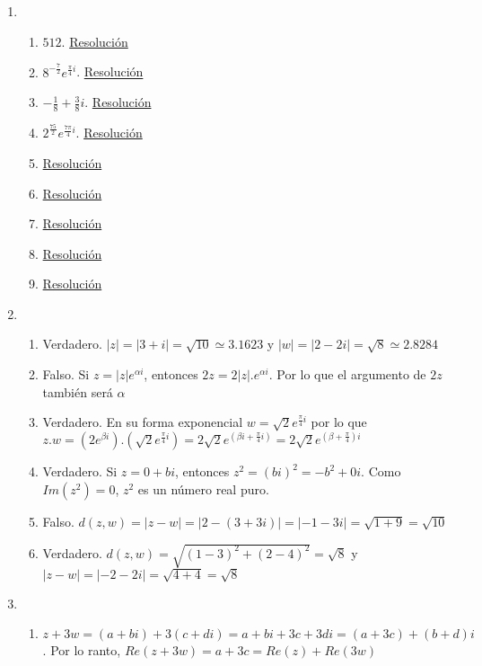 \documentclass[a4paper]{article}
\newcommand{\exercise}{\item}
\newcommand{\df}[2]{\displaystyle\frac{#1}{#2}}
\newcommand{\cis}[1]{\left[\cos\left({#1}\right)+i\sin\left({#1}\right)\right]}
\begin{document}
\begin{enumerate}
\begin{enumerate} [label=(\alph*)]
		\item $\cos\left(\df{\pi}{12}\right)+i\sin\left(\df{\pi}{12}\right)=e^{\frac{\pi}{12}} \simeq 0.9659 + 0.2588 i$
		\item $4e^{\frac{3\pi}{2}i}=4\cis{\df{3\pi}{2}}=0-4i$
\end{enumerate}\exercise\begin{enumerate} [label=(\alph*)]		\item $512$. \href{https://youtu.be/bi_tVZZeAtY}{Resolución}
		\item $8^{-\frac{7}{2}} e^{\frac{\pi}{4}i}$. \href{https://youtu.be/5ET1IAoQNdc}{Resolución}
		\item $-\df{1}{8}+\df{3}{8}i$. \href{https://youtu.be/xveCBuIad3s}{Resolución}
		\item $2^{\frac{75}{2}} e^{\frac{7\pi}{4}i}$. \href{https://youtu.be/fyrIGxGpW8g}{Resolución}
		\item \href{https://youtu.be/5Z0cwrDtvzU}{Resolución}
		\item \href{https://youtu.be/egki90qZmjQ}{Resolución}
		\item \href{https://youtu.be/GuqxEvxgHkQ}{Resolución}
		\item \href{https://youtu.be/x1KOtRgsRrg}{Resolución}
		\item \href{https://youtu.be/Be6upizltaE}{Resolución}
\end{enumerate}\exercise\begin{enumerate} [label=(\alph*)]		\item Verdadero. $|z|=|3+i|=\sqrt{10} \simeq 3.1623$ y $|w|=|2-2i|=\sqrt{8} \simeq 2.8284$
		\item Falso. Si $z=|z|e^{\alpha i}$, entonces $2z=2|z|.e^{\alpha i}$. Por lo que el argumento de $2z$ también será $\alpha$
		\item Verdadero. En su forma exponencial $w=\sqrt{2}e^{\frac{\pi}{4}i}$ por lo que $z.w=\left(2e^{\beta i}\right).\left(\sqrt{2}e^{\frac{\pi}{4}i}\right)=2\sqrt{2}e^{\left(\beta i + \frac{\pi}{4}i\right)}=2\sqrt{2}e^{\left(\beta + \frac{\pi}{4}\right)i}$
		\item Verdadero. Si $z=0+bi$, entonces $z^2=(bi)^2=-b^2+0i$. Como $Im(z^2)=0$, $z^2$ es un número real puro.
		\item Falso. $d(z,w)=|z-w|=|2-(3+3i)|=|-1-3i|=\sqrt{1+9}=\sqrt{10}$
		\item Verdadero. $d(z,w)=\sqrt{\left(1-3\right)^2+\left(2-4\right)^2}=\sqrt{8}$ y $|z-w|=|-2-2i|=\sqrt{4+4}=\sqrt{8}$
\end{enumerate}\exercise\begin{enumerate} [label=(\alph*)]		\item $z+3w=(a+bi)+3(c+di)=a+bi+3c+3di=(a+3c)+(b+d)i$. Por lo ranto, $Re(z+3w)=a+3c=Re(z)+Re(3w)$

\end{enumerate}
\end{enumerate}
\end{document}
